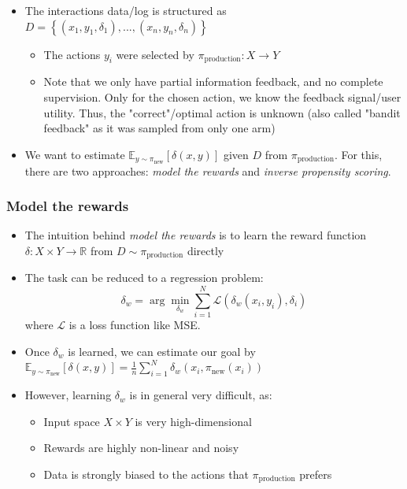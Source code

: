 \begin{itemize}
	\item The interactions data/log is structured as $D=\left\{\left(x_1, y_1, \delta_1\right),...,\left(x_n, y_n, \delta_n\right)\right\}$
	\begin{itemize}
		\item The actions $y_i$ were selected by $\pi_{\text{production}}:X\to Y$
		\item Note that we only have partial information feedback, and no complete supervision. Only for the chosen action, we know the feedback signal/user utility. Thus, the "correct"/optimal action is unknown (also called "bandit feedback" as it was sampled from only one arm)
	\end{itemize}
	\item We want to estimate $\mathbb{E}_{y\sim \pi_{\text{new}}}\left[\delta(x,y)\right]$ given $D$ from $\pi_{\text{production}}$. For this, there are two approaches: \textit{model the rewards} and \textit{inverse propensity scoring}.
\end{itemize}
\subsubsection{Model the rewards}
\begin{itemize}
	\item The intuition behind \textit{model the rewards} is to learn the reward function $\delta:X\times Y\to \mathbb{R}$ from $D\sim \pi_{\text{production}}$ directly
	\item The task can be reduced to a regression problem: $$\delta_w = \arg\min_{\delta_w} \sum\limits_{i=1}^{N} \mathcal{L}\left(\delta_w\left(x_i, y_i\right), \delta_i \right)$$
	where $\mathcal{L}$ is a loss function like MSE.
	\item Once $\delta_w$ is learned, we can estimate our goal by $\mathbb{E}_{y\sim \pi_{\text{new}}}\left[\delta(x,y)\right] = \frac{1}{n} \sum\limits_{i=1}^{N} \delta_w \left(x_i, \pi_{\text{new}}(x_i)\right)$
	\item However, learning $\delta_w$ is in general very difficult, as:
	\begin{itemize}
		\item Input space $X\times Y$ is very high-dimensional
		\item Rewards are highly non-linear and noisy
		\item Data is strongly biased to the actions that $\pi_{\text{production}}$ prefers
	\end{itemize}
\end{itemize}
